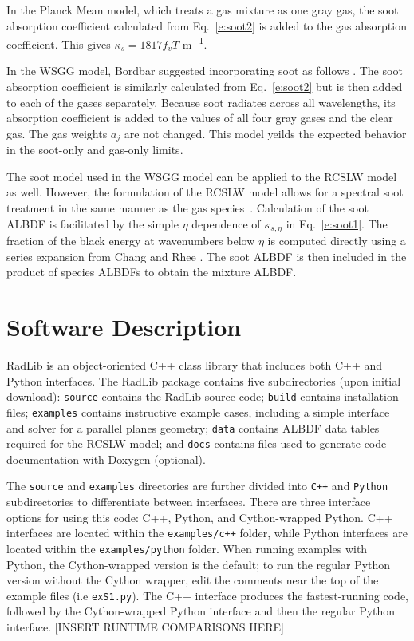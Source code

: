 \documentclass[preprint,12pt, a4paper]{elsarticle}
\begin{document}
In the Planck Mean model, which treats a gas mixture as one gray gas, the soot absorption coefficient calculated from Eq.~\ref{e:soot2} is added to the gas absorption coefficient. This gives $\kappa_s=1817f_vT$ \si{m^{-1}}.
 
In the WSGG model, Bordbar suggested incorporating soot as follows \cite{Bordbar_personal}. The soot absorption coefficient is similarly calculated from Eq.~\ref{e:soot2} but is then added to each of the gases separately. Because soot radiates across all wavelengths, its absorption coefficient is added to the values of all four gray gases and the clear gas. The gas weights $a_j$ are not changed. This model yeilds the expected behavior in the soot-only and gas-only limits.

The soot model used in the WSGG model can be applied to the RCSLW model as well. However, the formulation of the RCSLW model allows for a spectral soot treatment in the same manner as the gas species~\cite{Solovjov_2001}. Calculation of the soot ALBDF is facilitated by the simple $\eta$ dependence of $\kappa_{s,\eta}$ in Eq.~\ref{e:soot1}. The fraction of the black energy at wavenumbers below $\eta$ is computed directly using a series expansion from Chang and Rhee \cite{Chang_1984,Solovjov_2001}. The soot ALBDF is then included in the product of species ALBDFs to obtain the mixture ALBDF. 
 

\section{Software Description} \label{s:architechture}

RadLib is an object-oriented C++ class library that includes both C++ and Python interfaces. The RadLib package contains five subdirectories (upon initial download): \texttt{source} contains the RadLib source code; \texttt{build} contains installation files; \texttt{examples} contains instructive example cases, including a simple interface and solver for a parallel planes geometry; \texttt{data} contains ALBDF data tables required for the RCSLW model; and \texttt{docs} contains files used to generate code documentation with Doxygen (optional). 

The \texttt{source} and \texttt{examples} directories are further divided into \texttt{C++} and \texttt{Python} subdirectories to differentiate between interfaces. There are three interface options for using this code: C++, Python, and Cython-wrapped Python. C++ interfaces are located within the \texttt{examples/c++} folder, while Python interfaces are located within the \texttt{examples/python} folder. When running examples with Python, the Cython-wrapped version is the default; to run the regular Python version without the Cython wrapper, edit the comments near the top of the example files (i.e \texttt{ex\textunderscore S1.py}). The C++ interface produces the fastest-running code, followed by the Cython-wrapped Python interface and then the regular Python interface. [INSERT RUNTIME COMPARISONS HERE]
\end{document}
